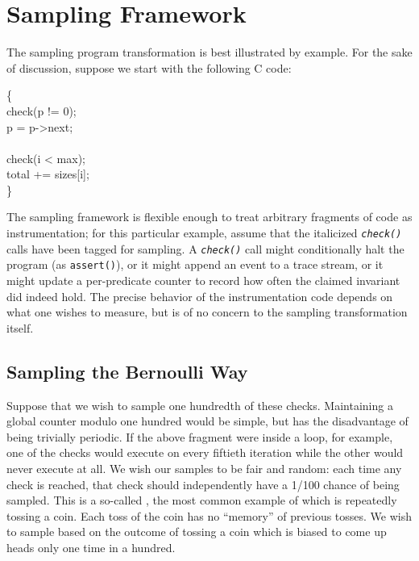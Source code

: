 \section{Sampling Framework}
\label{sec:framework}

The sampling program transformation is best illustrated by example.
For the sake of discussion, suppose we start with the following C
code:

\begin{code}
  \{\+ \\
  check(p != 0); \\
  \up p = p->next; \\
  \\
  check(i < max); \\
  \up total += sizes[i]; \\
  \<\}
\end{code}

The sampling framework is flexible enough to treat arbitrary fragments
of code as instrumentation; for this particular example, assume that
the italicized \texttt{\textit{check()}} calls have been tagged for
sampling.  A \texttt{\textit{check()}} call might conditionally halt
the program (as \texttt{assert()}), or it might append an event to a
trace stream, or it might update a per-predicate counter to record how
often the claimed invariant did indeed hold.  The precise behavior of
the instrumentation code depends on what one wishes to measure, but is
of no concern to the sampling transformation itself.

\subsection{Sampling the Bernoulli Way}

Suppose that we wish to sample one hundredth of these checks.
Maintaining a global counter modulo one hundred would be simple, but
has the disadvantage of being trivially periodic.  If the above
fragment were inside a loop, for example, one of the checks would
execute on every fiftieth iteration while the other would never
execute at all.  We wish our samples to be fair and random: each time
any check is reached, that check should independently have a 1/100
chance of being sampled.  This is a so-called , the most common example of which is repeatedly tossing a
coin.  Each toss of the coin has no ``memory'' of previous tosses.  We
wish to sample based on the outcome of tossing a coin which is biased
to come up heads only one time in a hundred.

